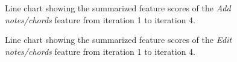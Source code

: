 		\begin{figure}[H]
			\centering
		    \caption{Line chart showing the summarized feature scores of the \textit{Add notes/chords} feature from iteration 1 to iteration 4.}
		    \label{fig:add-bar}
		\end{figure} 

		\begin{figure}[H]
			\centering
		    \caption{Line chart showing the summarized feature scores of the \textit{Edit notes/chords} feature from iteration 1 to iteration 4.}
		    \label{fig:edit-bar}
		\end{figure} 


